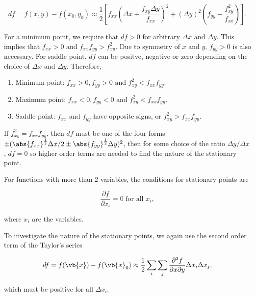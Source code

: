\documentclass[english,a4paper,12pt]{report}
\begin{document}
\begin{equation}
    df = f(x,y) - f(x_0 , y_0 ) \approx  \frac{1}{2} \left[ f_{xx}\left( \Delta x+ \frac{f_{xy}\Delta y }{f_{xx} }  \right)^2 + (\Delta y)^2\left( f_{yy} - \frac{f_{xy}^2 }{f_{xx} }   \right)  \right].
\end{equation}

For a minimum point, we require that \(df>0\) for arbitrary \(\Delta x \text { and } \Delta y\). This implies that \(f_{xx} >0 \text { and }  f_{xx}f_{yy} > f_{xy}^2\). Due to symmetry of \(x \text { and } y\), \(f_{y y } >0\) is also necessary. For saddle point, \(df\) can be positve, negative or zero depending on the choice of \(\Delta x \text { and } \Delta y\). Therefore,

\begin{enumerate}
    \item Minimum point: \(f_{xx} > 0, f_{yy} > 0 \text { and } f_{xy}^2 < f_{xx}f_{yy}\).
    \item Maximum point: \(f_{xx} < 0, f_{yy} < 0 \text { and } f_{xy}^2 < f_{xx}f_{yy}\).
    \item Saddle point: \(f_{xx} \text { and } f_{yy}\) have opposite signs, or \(f_{xy}^2 > f_{xx}f_{yy}\). 
\end{enumerate}

If \(f_{xy}^2 = f_{xx}f_{yy}\), then \(df\) must be one of the four forms \(\pm  (\abs{f_{xx} }^{\frac{1}{2} } \Delta x /2 \pm \abs{f_{yy} }^{\frac{1}{2} }\Delta y)^2\), then for some choice of the ratio \(\Delta y / \Delta x\), \(df = 0\) so higher order terms are needed to find the nature of the stationary point. 

For functions with more than 2 variables, the conditions for stationary points are 

\begin{equation}
    \frac{\partial f}{\partial x_{i} } = 0 \text{ for all }  x_{i},
\end{equation}

where \(x_{i} \) are the variables. 

To investigate the nature of the stationary points, we again use the second order term of the Taylor's series

\begin{equation}
    df = f(\vb{x} ) - f(\vb{x} _{0} ) \approx \frac{1}{2}\sum_{i} \sum_{j} \frac{\partial^2 f}{\partial x \partial y} \Delta x_{i}\Delta x_{j},      
\end{equation}

which must be positive for all \(\Delta x_{i} \).
\end{document}
